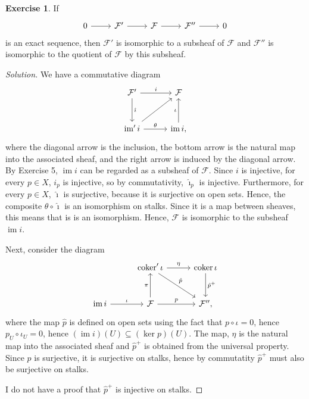 \documentclass[a4paper]{amsbook}
\theoremstyle{definition}
\newtheorem*{exercise*}{Exercise}
\DeclareMathOperator\coker{coker}
\DeclareMathOperator\im{im}
\begin{document}
\begin{exercise*}
\label{second}
If
\[\begin{tikzcd}
	0 \arrow[r] & \mathcal{F}' \arrow[r] & \mathcal{F}  \arrow[r] & \mathcal{F}'' \arrow[r] & 0
\end{tikzcd}\]
is an exact sequence, then $\mathcal{F}'$ is isomorphic to a subsheaf of $\mathcal{F}$ and
$\mathcal{F}''$ is isomorphic to the quotient of $\mathcal{F}$ by this subsheaf.
\end{exercise*}
\begin{proof}[Solution]
We have a commutative diagram
\[\begin{tikzcd}[row sep=1cm, column sep=1cm]
	\mathcal{F'}\ar[d, "\hat{\imath}"]\ar[r, "i"] & \mathcal{F}\\
	\im' i\ar[r, "\theta"]\ar[ur] & \im i,\ar[u, "\iota"]
\end{tikzcd}\]
where the diagonal arrow is the inclusion, the bottom arrow is the natural map
into the associated sheaf, and the right arrow is induced by the diagonal arrow.
By Exercise 5, $\im i$ can be regarded as a subsheaf of $\mathcal{F}$.
Since $i$ is injective, for every $p \in X$, $i_p$ is injective, so by commutativity,
$\hat{\imath}_p$ is injective. Furthermore, for every $p \in X$, $\hat{\imath}$
is surjective, because it is surjective on open sets. Hence, the composite
$\theta \circ \hat{\imath}$ is an isomorphism on stalks. Since it is a map between
sheaves, this means that is is an isomorphism. Hence, $\mathcal{F}$ is isomorphic
to the subsheaf $\im i$.

Next, consider the diagram
\[\begin{tikzcd}[row sep=1cm, column sep=1cm]
	&\coker'\iota\ar[r, "\eta"]\ar[dr, "\hat{p}"]& \coker\iota\ar[d, "\hat{p}^+"]\\
	\im i\ar[r, "\iota"] &\mathcal{F}\ar[r, "p"]\ar[u, "\pi"] &\mathcal{F}'',
\end{tikzcd}\]
where the map $\hat{p}$ is defined on open sets using the fact that
$p \circ \iota = 0$, hence $p_U \circ \iota_U = 0$, hence $(\im i)(U) \subseteq (\ker p)(U)$.
The map, $\eta$ is the natural map into the associated sheaf and
$\hat{p}^+$ is obtained from the universal property. Since $p$ is surjective,
it is surjective on stalks, hence by commutatity $\hat{p}^+$ must also be surjective
on stalks.

I do not have a proof that $\hat{p}^+$ is injective on stalks.
\end{proof}
\end{document}
